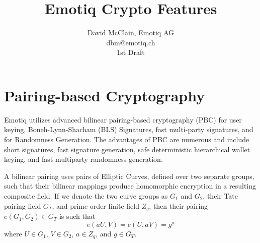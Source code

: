 \documentclass[article,oneside]{memoir}
\title{Emotiq Crypto Features}
\author{David McClain, Emotiq AG\\dbm@emotiq.ch\\1st Draft}
\begin{document}
\maketitle

\tableofcontents*




\chapter{Pairing-based Cryptography}

Emotiq utilizes advanced bilinear pairing-based cryptography\cite{thesis}\cite{lib} (PBC) for user keying, Boneh-Lynn-Shacham (BLS) Signatures\cite{bls}, fast multi-party signatures, and for Randomness Generation. The advantages of PBC are numerous and include short signatures, fast signature generation, safe deterministic hierarchical wallet keying, and fast multiparty randomness generation.

A bilinear pairing uses pairs of Elliptic Curves, defined over two separate groups, such that their bilinear mappings produce homomorphic encryption in a resulting composite field. If we denote the two curve groups as $G_1$ and $G_2$,  their Tate pairing field $G_T$, and prime order finite field $Z_q$, then their pairing $e(G_1,G_2) \in G_T$ is such that $$e(a U, V) = e(U, a V)= g^a$$ where $U \in G_1$, $V \in G_2$, $a \in Z_q$, and $g \in G_T$.
\end{document}
